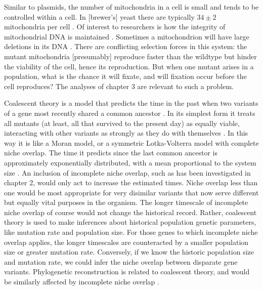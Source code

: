 Similar to plasmids, the number of mitochondria in a cell is small and tends to be controlled within a cell. 
In [brewer's] yeast there are typically $34\pm 2$ mitochondria per cell \cite{bionumbers}. 
Of interest to researchers is how the integrity of mitochondrial DNA is maintained \cite{Nunn}. 
Sometimes a mitochondrion will have large deletions in its DNA \cite{???}. 
There are conflicting selection forces in this system: the mutant mitochondria [presumably] reproduce faster than the wildtype but hinder the viability of the cell, hence its reproduction. 
But when one mutant arises in a population, what is the chance it will fixate, and will fixation occur before the cell reproduces? 
The analyses of chapter 3 are relevant to such a problem. 

Coalescent theory is a model that predicts the time in the past when two variants of a gene most recently shared a common ancestor \cite{???}. 
In its simplest form it treats all mutants (at least, all that survived to the present day) as equally viable, interacting with other variants as strongly as they do with themselves \cite{?}. 
In this way it is like a Moran model, or a symmetric Lotka-Volterra model with complete niche overlap. 
The time it predicts since the last common ancestor is approximately exponentially distributed, with a mean proportional to the system size \cite{?}. 
An inclusion of incomplete niche overlap, such as has been investigated in chapter 2, would only act to increase the estimated times. 
Niche overlap less than one would be most appropriate for very disimilar variants that now serve different but equally vital purposes in the organism. 
The longer timescale of incomplete niche overlap of course would not change the historical record. 
Rather, coalescent theory is used to make inferences about historical population genetic parameters, like mutation rate and population size. 
For those genes to which incomplete niche overlap applies, the longer timescales are counteracted by a smaller population size or greater mutation rate. 
Conversely, if we know the historic population size and mutation rate, we could infer the niche overlap between disparate gene variants. 
Phylogenetic reconstruction is related to coalescent theory, and would be similarly affected by incomplete niche overlap \cite{???}. 


